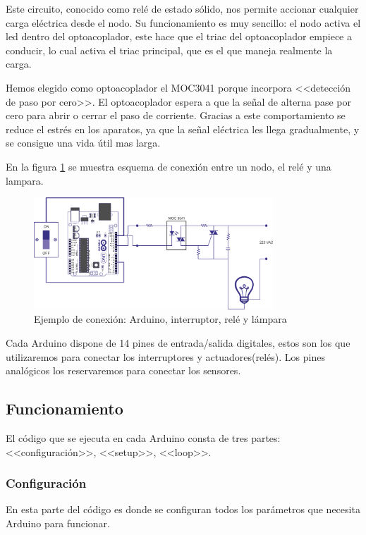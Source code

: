  Este circuito, conocido como relé de estado sólido, nos permite accionar cualquier carga eléctrica desde el nodo. Su funcionamiento es muy sencillo: el nodo activa el led dentro del optoacoplador, este hace que el triac del optoacoplador empiece a conducir, lo cual activa el triac principal, que es el que maneja realmente la carga. 
 
 Hemos elegido como optoacoplador el MOC3041 porque incorpora <<detección de paso por cero>>. El optoacoplador espera a que la señal de  alterna pase por cero para abrir o cerrar el paso de corriente. Gracias a este comportamiento se reduce el estrés en los aparatos, ya que la señal eléctrica les llega gradualmente, y se consigue una vida útil mas larga.
  
En la figura \ref{fig:ard_int_lamp} se muestra esquema de conexión entre un nodo, el relé y una lampara.

\begin{figure}[htb]
    \centering
    \includegraphics[width=0.8\textwidth]{imagenes/arduino_lampara.png}
    \caption{Ejemplo de conexión: Arduino, interruptor, relé y lámpara}
    \label{fig:ard_int_lamp}
\end{figure}

Cada Arduino dispone de 14 pines de entrada/salida digitales, estos son los que utilizaremos para conectar los interruptores y actuadores(relés). Los pines analógicos los reservaremos para conectar los sensores.

\subsection{Funcionamiento}

El código que se ejecuta en cada Arduino consta de tres partes: <<configuración>>, <<setup>>, <<loop>>.
\subsubsection{Configuración}
En esta parte del código es donde se configuran todos los parámetros que necesita Arduino para funcionar.

